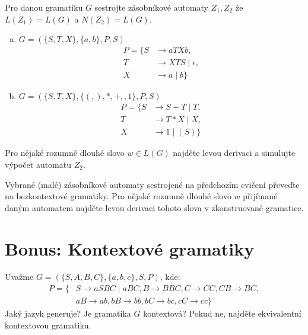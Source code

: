 \documentclass[a4paper,12pt]{amsart}
\begin{document}
\medskip\begin{problem}

    Pro danou gramatiku $G$ sestrojte zásobníkové automaty $Z_1,Z_2$ že $L(Z_1)=L(G)$ a $N(Z_2)=L(G)$.

    \medskip

    \begin{enumerate}[(a)]\setlength\itemsep{6pt}
        \item $G=(\{S,T,X\},\{a,b\},P,S)$
            \begin{align*}
        P=\{S&\rightarrow aTXb, \\
        T&\rightarrow XTS\mid \epsilon,\\ 
        X&\rightarrow a\mid b\}
        \end{align*}
        \item $G=(\{S,T,X\},\{(,),*,+,,1\},P,S)$
            \begin{align*}
        P=\{S&\rightarrow S+T\mid T, \\
        T&\rightarrow T*X\mid X,\\ 
        X&\rightarrow 1\mid (S)\}
        \end{align*}
    \end{enumerate}

    Pro nějaké rozumně dlouhé slovo $w\in L(G)$ najděte levou derivaci a simulujte výpočet automatu $Z_2$.

\end{problem}
    

\medskip\begin{problem}

    Vybrané (malé) zásobníkové automaty sestrojené na předchozím cvičení převeďte na bezkontextové gramatiky. Pro nějaké rozumně dlouhé slovo $w$ přijímané daným automatem najděte levou derivaci tohoto slova v zkonstruované gramatice.

\end{problem}


\section*{Bonus: Kontextové gramatiky}


\medskip\begin{problem}
    
    Uvažme $G=(\{S,A,B,C\},\{a,b,c\},S,P)$, kde:
    \begin{align*}
        P=\{&S\rightarrow aSBC\mid aBC, B\rightarrow BBC,  C\rightarrow CC, CB\rightarrow BC,\\ 
        &aB\rightarrow ab, bB\rightarrow bb, bC\rightarrow bc, cC\rightarrow cc\}
    \end{align*}
    Jaký jazyk generuje? Je gramatika $G$ kontextová? Pokud ne, najděte ekvivalentní kontextovou gramatiku.
    
\end{problem}
\end{document}
